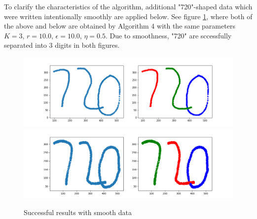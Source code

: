 \documentclass[11pt,reqno]{amsart}
\numberwithin{equation}{section}
\theoremstyle{plain}
\begin{document}
To clarify the characteristics of the algorithm, additional "720"-shaped data which were written intentionally smoothly are applied below.  See figure \ref{fig3}, where both of the above and below are obtained by Algorithm 4 with the same parameters $K = 3$, $r = 10.0$, $\epsilon = 10.0$, $\eta = 0.5$. Due to smoothness, "720" are sccessfully separated into 3 digits in both figures.

\begin{figure}[htbp]
\centering
\vspace{-1em}
\includegraphics[width=1.0  \textwidth]{smooth_720_1.png}
\includegraphics[width=1.0  \textwidth]{smooth_720_2.png}
\vspace{-2em}
\caption{Successful results with smooth data}
\label{fig3}
\end{figure}
\end{document}
